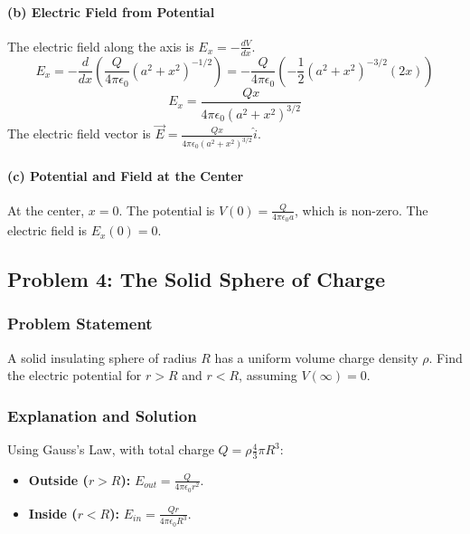 \documentclass{article}
\begin{document}
\paragraph{(b) Electric Field from Potential}
The electric field along the axis is $E_x = -\frac{dV}{dx}$.
$$ E_x = -\frac{d}{dx} \left( \frac{Q}{4\pi\epsilon_0}(a^2 + x^2)^{-1/2} \right) = -\frac{Q}{4\pi\epsilon_0} \left(-\frac{1}{2}(a^2 + x^2)^{-3/2}(2x)\right) $$
$$ E_x = \frac{Qx}{4\pi\epsilon_0(a^2 + x^2)^{3/2}} $$
The electric field vector is $\vec{E} = \frac{Qx}{4\pi\epsilon_0(a^2 + x^2)^{3/2}} \hat{i}$.

\paragraph{(c) Potential and Field at the Center}
At the center, $x=0$.
The potential is $V(0) = \frac{Q}{4\pi\epsilon_0 a}$, which is non-zero.
The electric field is $E_x(0) = 0$.

\hrulefill

\subsection{Problem 4: The Solid Sphere of Charge}
\subsubsection*{Problem Statement}
A solid insulating sphere of radius $R$ has a uniform volume charge density $\rho$. Find the electric potential for $r > R$ and $r < R$, assuming $V(\infty)=0$.

\begin{center}
\end{center}

\subsubsection*{Explanation and Solution}
Using Gauss's Law, with total charge $Q = \rho \frac{4}{3}\pi R^3$:
\begin{itemize}
    \item \textbf{Outside ($r > R$):} $E_{out} = \frac{Q}{4\pi\epsilon_0 r^2}$.
    \item \textbf{Inside ($r < R$):} $E_{in} = \frac{Q r}{4\pi\epsilon_0 R^3}$.
\end{itemize}
\end{document}

